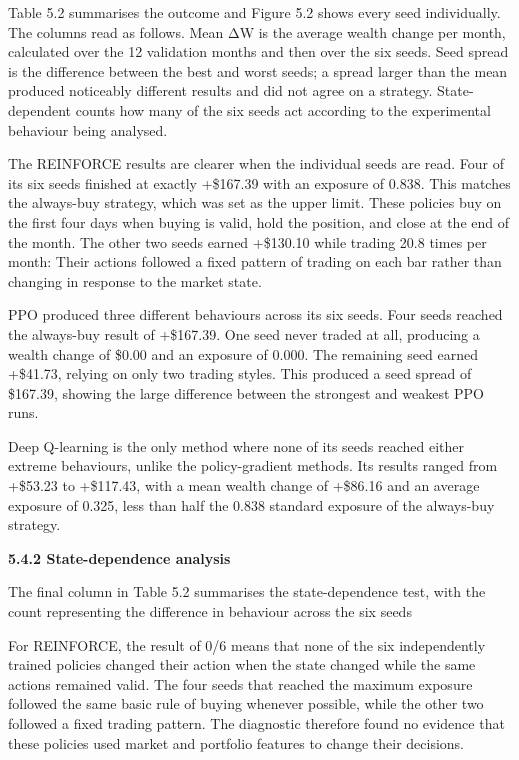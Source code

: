 Table 5.2 summarises the outcome and Figure 5.2 shows every seed
individually. The columns read as follows. Mean ΔW is the average wealth
change per month, calculated over the 12 validation months and then over
the six seeds. Seed spread is the difference between the best and worst
seeds; a spread larger than the mean produced noticeably different
results and did not agree on a strategy. State-dependent counts how many
of the six seeds act according to the experimental behaviour being
analysed.

The REINFORCE results are clearer when the individual seeds are read.
Four of its six seeds finished at exactly +\$167.39 with an exposure of
0.838. This matches the always-buy strategy, which was set as the upper
limit. These policies buy on the first four days when buying is valid,
hold the position, and close at the end of the month. The other two
seeds earned +\$130.10 while trading 20.8 times per month: Their actions
followed a fixed pattern of trading on each bar rather than changing in
response to the market state.

PPO produced three different behaviours across its six seeds. Four seeds
reached the always-buy result of +\$167.39. One seed never traded at
all, producing a wealth change of \$0.00 and an exposure of 0.000. The
remaining seed earned +\$41.73, relying on only two trading styles. This
produced a seed spread of \$167.39, showing the large difference between
the strongest and weakest PPO runs.

Deep Q-learning is the only method where none of its seeds reached
either extreme behaviours, unlike the policy-gradient methods. Its
results ranged from +\$53.23 to +\$117.43, with a mean wealth change of
+\$86.16 and an average exposure of 0.325, less than half the 0.838
standard exposure of the always-buy strategy.

\textbf{5.4.2 State-dependence analysis}

The final column in Table 5.2 summarises the state-dependence test, with
the count representing the difference in behaviour across the six seeds

For REINFORCE, the result of 0/6 means that none of the six
independently trained policies changed their action when the state
changed while the same actions remained valid. The four seeds that
reached the maximum exposure followed the same basic rule of buying
whenever possible, while the other two followed a fixed trading pattern.
The diagnostic therefore found no evidence that these policies used
market and portfolio features to change their decisions.

